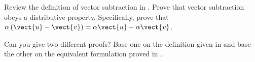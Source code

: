 Review the definition of vector subtraction in .  Prove that vector subtraction obeys a distributive property.  Specifically, prove that $\alpha\left(\vect{u}-\vect{v}\right)=\alpha\vect{u}-\alpha\vect{v}$.\par
%
Can you give two different proofs? Base one on the definition given in  and base the other on the equivalent formulation proved in .